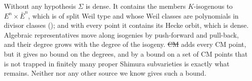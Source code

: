\begin{remark}\label{rem:degrees}
Without any hypothesis $\Sigma$ is dense. It contains the members
$K$-isogenous to $E^{n}\times\bar E^{n}$, which is of split Weil type and
whose Weil classes are polynomials in divisor classes ();
and with every point it contains its Hecke orbit, which is dense. Algebraic representatives move
along isogenies by push-forward and pull-back, and their degree grows with
the degree of the isogeny. \st{CM} adds every CM point, but it gives no bound
on the degrees, and by  a bound on a set of CM points that is
not trapped in finitely many proper Shimura subvarieties is exactly what
remains. Neither \cite{OAI26} nor any other source we know gives such a
bound.
\end{remark}
